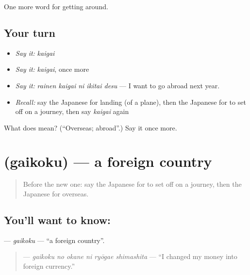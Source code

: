 \begin{grammarlens}[title={What you've built}]
One more word for getting around.
\end{grammarlens}

\subsection*{Your turn}
\begin{itemize}
\raggedright
  \item \emph{Say it:} \emph{kaigai}
  \item \emph{Say it:} \emph{kaigai}, once more
  \item \emph{Say it:} \emph{rainen kaigai ni ikitai desu} — I want to go abroad next year.
  \item \emph{Recall:} say the Japanese for landing (of a plane), then the Japanese for to set off on a journey, then say \emph{kaigai} again
\end{itemize}

\begin{tcolorbox}[breakable,colback=teal!4,colframe=teal!35!black,title={Before you move on}]
What does  mean? (\textquotedblleft{}Overseas; abroad\textquotedblright{}.) Say it once more.
\end{tcolorbox}
\section[\texorpdfstring{\ja{がいこく} (gaikoku)}{がいこく (gaikoku)}]{ (gaikoku) — a foreign country}

\label{lesson:JA-C385-gaikoku}



\begin{quote}
Before the new one: say the Japanese for to set off on a journey, then the Japanese for overseas.
\end{quote}

\subsection*{You'll want to know: }
\textbf{} — \emph{gaikoku} — \textquotedblleft{}a foreign country\textquotedblright{}.

\begin{quote}
\textbf{  } — \emph{gaikoku no okane ni ryōgae shimashita} — \textquotedblleft{}I changed my money into foreign currency.\textquotedblright{}
\end{quote}

